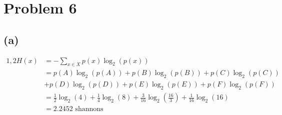 \section*{Problem 6}
\subsection*{(a)}
\begin{align*}1,2
	H(x)&=-\sum_{x\in X} p(x)\log_2(p(x))\\
	&=p(A)\log_2(p(A))+p(B)\log_2(p(B))+p(C)\log_2(p(C))\\&+p(D)\log_2(p(D))+p(E)\log_2(p(E))+p(F)\log_2(p(F))\\
	&=\frac{1}{2}\log_2(4)+\frac{1}{4}\log_2(8)+\frac{3}{16}\log_2(\frac{16}{3})+\frac{1}{16}\log_2(16)\\
	&=\boxed{2.2452\text{ shannons}}
\end{align*}

